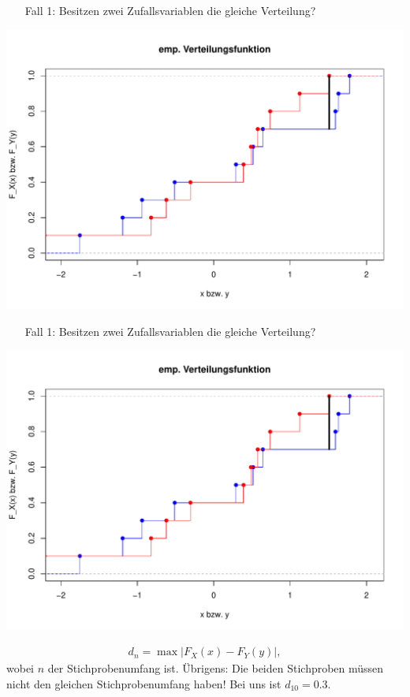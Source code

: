 \documentclass[t,11pt,aspectratio=169]{beamer}
\begin{document}
\begin{frame}
\begin{enumerate}
	\item[Fall 1:] Besitzen zwei Zufallsvariablen die gleiche Verteilung?
\end{enumerate}
\begin{center}
	\includegraphics[scale=0.45]{Rplot01.pdf}
\end{center}
\end{frame}

\begin{frame}
\begin{enumerate}
	\item[Fall 1:] Besitzen zwei Zufallsvariablen die gleiche Verteilung?
\end{enumerate}
\begin{center}
	\includegraphics[scale=0.3]{Rplot01.pdf}
\end{center}
\begin{align*}
	d_n = \max \left| F_X(x) - F_Y(y)  \right|,
\end{align*}
wobei $n$ der Stichprobenumfang ist. Übrigens: Die beiden Stichproben müssen nicht den gleichen Stichprobenumfang haben!
\pause
Bei uns ist $d_{10} = 0.3$.
\end{frame}
\end{document}
